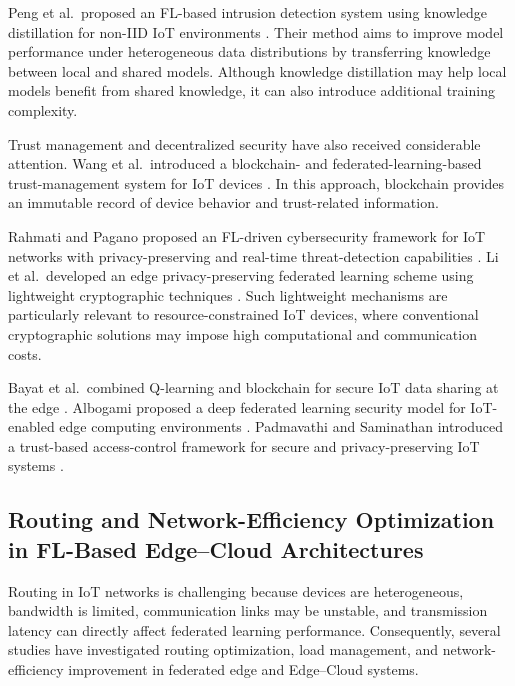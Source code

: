 \documentclass[5p,times,numafflabel]{elsarticle}
\begin{document}
	Peng et al.\ proposed an FL-based intrusion detection system using
	knowledge distillation for non-IID IoT environments
	\cite{peng2025fdids}. Their method aims to improve model performance
	under heterogeneous data distributions by transferring knowledge
	between local and shared models. Although knowledge distillation may
	help local models benefit from shared knowledge, it can also introduce
	additional training complexity.
	
	Trust management and decentralized security have also received
	considerable attention. Wang et al.\ introduced a blockchain- and
	federated-learning-based trust-management system for IoT devices
	\cite{wang2024trust}. In this approach, blockchain provides an
	immutable record of device behavior and trust-related information.
	
	Rahmati and Pagano proposed an FL-driven cybersecurity framework for
	IoT networks with privacy-preserving and real-time threat-detection
	capabilities \cite{rahmati2025cybersecurity}. Li et al.\ developed an
	edge privacy-preserving federated learning scheme using lightweight
	cryptographic techniques \cite{li2023privacy}. Such lightweight
	mechanisms are particularly relevant to resource-constrained IoT
	devices, where conventional cryptographic solutions may impose high
	computational and communication costs.
	
	Bayat et al.\ combined Q-learning and blockchain for secure IoT data
	sharing at the edge \cite{bayat2025qlearning}. Albogami proposed a
	deep federated learning security model for IoT-enabled edge computing
	environments \cite{albogami2025deepfl}. Padmavathi and Saminathan
	introduced a trust-based access-control framework for secure and
	privacy-preserving IoT systems \cite{padmavathi2025trust}.
	

	\subsection{Routing and Network-Efficiency Optimization in
		FL-Based Edge--Cloud Architectures}
	\label{subsec:routing-efficiency}
	
	Routing in IoT networks is challenging because devices are
	heterogeneous, bandwidth is limited, communication links may be
	unstable, and transmission latency can directly affect federated
	learning performance. Consequently, several studies have investigated
	routing optimization, load management, and network-efficiency
	improvement in federated edge and Edge--Cloud systems.
	
\end{document}
